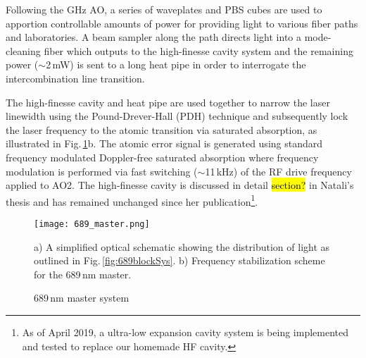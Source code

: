 Following the GHz AO, a series of waveplates and PBS cubes are used to apportion controllable amounts of power for providing light to various fiber paths and laboratories.
A beam sampler along the path directs light into a mode-cleaning fiber which outputs to the high-finesse cavity system and the remaining power ($\sim$2\,mW) is sent to a long heat pipe in order to interrogate the intercombination line transition.

The high-finesse cavity and heat pipe are used together to narrow the laser linewidth using the Pound-Drever-Hall (PDH) technique and subsequently lock the laser frequency to the atomic transition via saturated absorption, as illustrated in Fig.\,\ref{fig:689master}b.
The atomic error signal is generated using standard frequency modulated Doppler-free saturated absorption where frequency modulation is performed via fast switching ($\sim$11\,kHz) of the RF drive frequency applied to AO2.
The high-finesse cavity is discussed in detail \hl{section?} in Natali's thesis and has remained unchanged since her publication\footnote{As of April 2019, a ultra-low expansion cavity system is being implemented and tested to replace our homemade HF cavity.}.
%
	\begin{figure} 
		\centerline{
		\texttt{[image: 689\_master.png]}}
		\caption{689\,nm master system}{a) A simplified optical schematic showing the distribution of light as outlined in Fig.\,\ref{fig:689blockSys}. b) Frequency stabilization scheme for the 689\,nm master.}
		\label{fig:689master}
	\end{figure}





